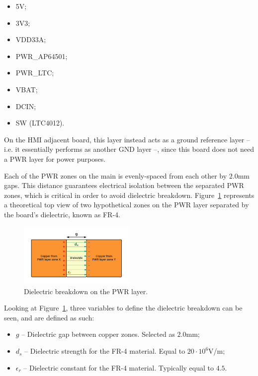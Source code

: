 \begin{itemize}
	\item 5V;
	\item 3V3;
	\item VDD33A;
	\item PWR\_AP64501;
	\item PWR\_LTC;
	\item VBAT;
	\item DCIN;
	\item SW (LTC4012).
\end{itemize}

On the HMI adjacent board, this layer instead acts as a ground reference layer -- i.e. it essentially performs as another GND layer --, since this board does not need a PWR layer for power purposes. 

Each of the PWR zones on the main is evenly-spaced from each other by $2.0$mm gaps. This distance guarantees electrical isolation between the separated PWR zones, which is critical in order to avoid dielectric breakdown. Figure~\ref{fig:dielectric_breakdown} represents a theoretical top view of two hypothetical zones on the PWR layer separated by the board's dielectric, known as FR-4.

\begin{figure}[h]
    \centering
    \includegraphics[width=0.5\textwidth]{Chapters/Figures/chapter5/dielectric_breakdown.pdf}
    \caption{Dielectric breakdown on the PWR layer.}
    \label{fig:dielectric_breakdown}
\end{figure}

Looking at Figure~\ref{fig:dielectric_breakdown}, three variables to define the dielectric breakdown can be seen, and are defined as such:
\begin{itemize}
	\item $g$ -- Dielectric gap between copper zones. Selected as $2.0$mm;
	
	\item $d_s$ -- Dielectric strength for the FR-4 material. Equal to $20 \cdot 10^{6}$V/m;
	
	\item $\epsilon_r$ -- Dielectric constant for the FR-4 material. Typically equal to $4.5$.
\end{itemize}

